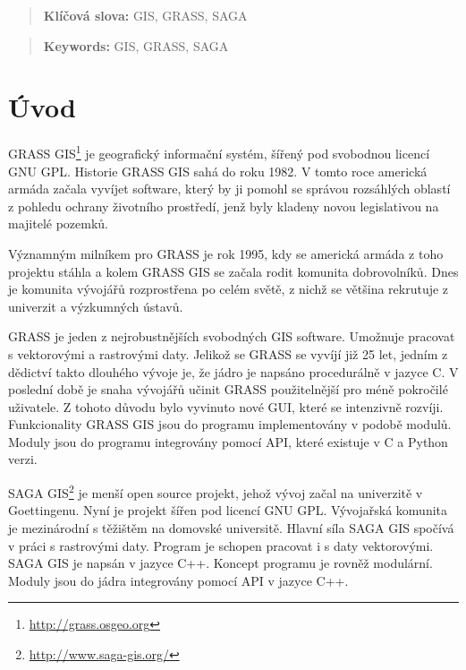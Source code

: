 \documentclass[a4paper,12pt]{article}
\author{Štěpán Turek}
\newcommand{\klicslova}[2]{\noindent\textbf{#1: }#2}
\newcommand{\necislovana}[1]{%
\phantomsection
\addcontentsline{toc}{section}{#1}
\section*{#1}
\markboth{\uppercase{#1}}{}
}
\begin{document}
\pagestyle{empty}


\newpage





\begin{abstract}

\bigskip

\klicslova{Klíčová slova}{GIS, GRASS, SAGA}

\end{abstract}

\begin{abstract}

\bigskip

\klicslova{Keywords}{GIS, GRASS, SAGA}

\end{abstract}


\newpage

\newpage
\tableofcontents


\newpage
\pagestyle{fancy}

\necislovana{Úvod}



GRASS GIS\footnote{\url{http://grass.osgeo.org}} je geografický informační systém, šířený  pod svobodnou licencí GNU GPL.  
Historie GRASS GIS sahá do roku 1982. V tomto roce americká armáda začala vyvíjet software, který by ji pomohl se správou rozsáhlých oblastí z pohledu ochrany 
životního prostředí, jenž byly kladeny novou legislativou na majitelé pozemků.
 
Významným milníkem pro GRASS je rok 1995, kdy se americká armáda z toho projektu stáhla a kolem GRASS GIS se začala rodit komunita dobrovolníků. 
Dnes je komunita vývojářů rozprostřena po celém světě, z nichž se většina rekrutuje z univerzit a výzkumných ústavů. 

GRASS je jeden z nejrobustnějších svobodných GIS software. Umožnuje pracovat s vektorovými a rastrovými daty.
Jelikož se GRASS se vyvíjí již 25 let, jedním z dědictví takto dlouhého vývoje je, že  jádro je napsáno procedurálně v jazyce C. 
V poslední době je snaha vývojářů učinit GRASS použitelnější pro méně pokročilé uživatele. Z tohoto důvodu bylo vyvinuto nové GUI, které se intenzivně rozvíji. 
Funkcionality GRASS GIS jsou do programu implementovány v podobě modulů. Moduly jsou do programu integrovány pomocí API, které existuje v C a Python verzi.

SAGA GIS\footnote{\url{http://www.saga-gis.org/}} je menší open source projekt, jehož vývoj začal na
 univerzitě v Goettingenu. Nyní je projekt šířen pod  licencí GNU GPL. Vývojařská 
komunita je mezinárodní s těžištěm na domovské universitě. Hlavní síla SAGA GIS spočívá v práci s rastrovými daty. Program je schopen pracovat i s daty vektorovými. 
SAGA GIS je napsán v jazyce  C++.  Koncept programu je rovněž modulární. Moduly jsou do jádra integrovány pomocí API v jazyce C++.
\end{document}
